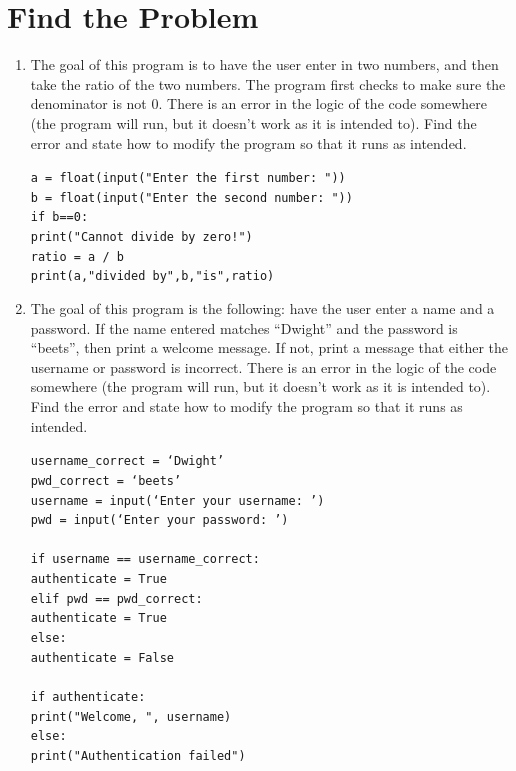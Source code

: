 \documentclass{article}
\begin{document}
\section*{Find the Problem}
\begin{enumerate}
	\item The goal of this program is to have the user enter in two numbers, and then take the ratio of the two numbers. The program first checks to make sure the denominator is not 0. There is an error in the logic of the code somewhere (the program will run, but it doesn't work as it is intended to). Find the error and state how to modify the program so that it runs as intended.
	
	\texttt{a = float(input("Enter the first number: "))}\\
	\texttt{b = float(input("Enter the second number: "))}\\
	\texttt{if b==0:}\\
	\null\quad\texttt{print("Cannot divide by zero!")}\\
	\texttt{ratio = a / b}\\
	\texttt{print(a,"divided by",b,"is",ratio)}
	\item The goal of this program is the following: have the user enter a name and a password. If the name entered matches ``Dwight'' and the password is ``beets'', then print a welcome message. If not, print a message that either the username or password is incorrect. There is an error in the logic of the code somewhere (the program will run, but it doesn't work as it is intended to). Find the error and state how to modify the program so that it runs as intended.
	
	\texttt{username\_correct = `Dwight'}\\
	\texttt{pwd\_correct = `beets'}\\
	\texttt{username = input(`Enter your username: ')}\\
	\texttt{pwd = input(`Enter your password: ')}\\ \\
	\texttt{if username == username\_correct:}\\
	\null\quad\texttt{authenticate = True}\\
	\texttt{elif pwd == pwd\_correct:}\\
	\null\quad\texttt{authenticate = True}\\
	\texttt{else:}\\
	\null\quad\texttt{authenticate = False}\\ \\
	\texttt{if authenticate:}\\
	\null\quad\texttt{print("Welcome, ", username)}\\
	\texttt{else:}\\ 
	\null\quad\texttt{print("Authentication failed")}
	
\end{enumerate}
\end{document}
